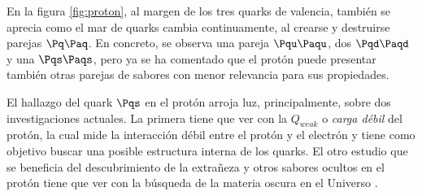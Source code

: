 En la figura \ref{fig:proton}, al margen de los tres quarks de valencia, también se aprecia como el mar de quarks cambia continuamente, al crearse y destruirse parejas $\Pq\Paq$. En concreto, se observa una pareja $\Pqu\Paqu$, dos $\Pqd\Paqd$ y una $\Pqs\Paqs$, pero ya se ha comentado que el protón puede presentar también otras parejas de sabores con menor relevancia para sus propiedades. 

El hallazgo del quark $\Pqs$ en el protón arroja luz, principalmente, sobre dos investigaciones actuales. La primera tiene que ver con la $Q_{weak}$ o \textit{carga débil} del protón, la cual mide la  interacción débil entre el protón y el electrón y tiene como objetivo buscar una posible estructura interna de los quarks. El otro estudio que se beneficia del descubrimiento de la extrañeza y otros sabores ocultos en el protón tiene que ver con la búsqueda de la materia oscura en el Universo \cite{protonYoung}. 